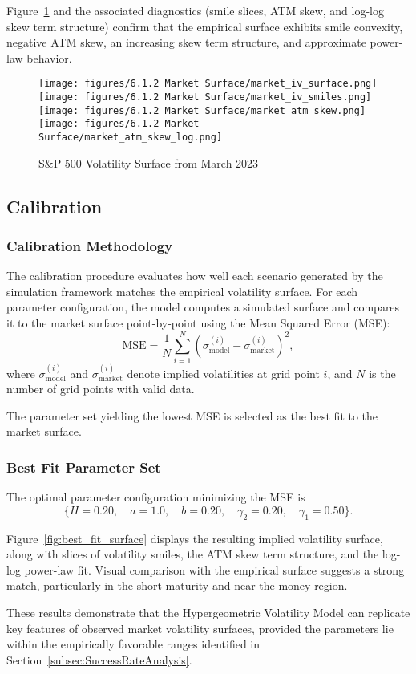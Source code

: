 Figure~\ref{fig:market_surface} and the associated diagnostics (smile slices, ATM skew, and log-log skew term structure) confirm that the empirical surface exhibits smile convexity, negative ATM skew, an increasing skew term structure, and approximate power-law behavior.
\begin{figure}[H]
    \centering
    \texttt{[image: figures/6.1.2 Market Surface/market\_iv\_surface.png]}
    \texttt{[image: figures/6.1.2 Market Surface/market\_iv\_smiles.png]}
    \texttt{[image: figures/6.1.2 Market Surface/market\_atm\_skew.png]}
    \texttt{[image: figures/6.1.2 Market Surface/market\_atm\_skew\_log.png]}
    \caption{S\&P 500 Volatility Surface from March 2023}
    \label{fig:market_surface}
\end{figure}


\subsection{Calibration}

\subsubsection*{Calibration Methodology}
The calibration procedure evaluates how well each scenario generated by the simulation framework matches the empirical volatility surface. For each parameter configuration, the model computes a simulated surface and compares it to the market surface point-by-point using the Mean Squared Error (MSE):
\begin{equation}
    \text{MSE} = \frac{1}{N} \sum_{i=1}^{N} \left( \sigma_{\text{model}}^{(i)} - \sigma_{\text{market}}^{(i)} \right)^2,    
\end{equation}
where $\sigma_{\text{model}}^{(i)}$ and $\sigma_{\text{market}}^{(i)}$ denote implied volatilities at grid point $i$, and $N$ is the number of grid points with valid data.

The parameter set yielding the lowest MSE is selected as the best fit to the market surface.

\subsubsection*{Best Fit Parameter Set}
The optimal parameter configuration minimizing the MSE is
\begin{equation*}
    \{ H = 0.20,\quad a = 1.0,\quad b = 0.20,\quad \gamma_2 = 0.20,\quad \gamma_1 = 0.50 \}.
\end{equation*}

Figure~\ref{fig:best_fit_surface} displays the resulting implied volatility surface, along with slices of volatility smiles, the ATM skew term structure, and the log-log power-law fit. Visual comparison with the empirical surface suggests a strong match, particularly in the short-maturity and near-the-money region.

These results demonstrate that the Hypergeometric Volatility Model can replicate key features of observed market volatility surfaces, provided the parameters lie within the empirically favorable ranges identified in Section~\ref{subsec:SuccessRateAnalysis}.
